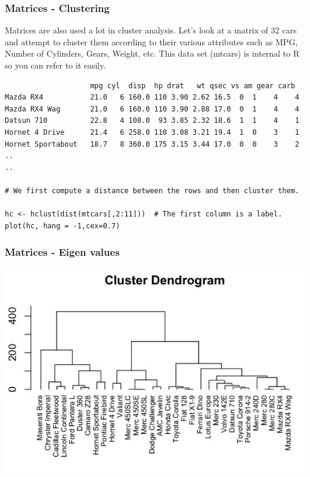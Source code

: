 \documentclass{beamer}
\begin{document}
%

\begin{frame}[fragile]
\frametitle{Matrices - Clustering}
Matrices are also used a lot in cluster analysis. Let's look at a matrix of 32 cars and attempt to cluster them according to their various attributes such as MPG, Number of Cylinders, Gears, Weight, etc. This data set (mtcars) is internal to R so you can refer to it easily.
\newline
\scriptsize
\begin{verbatim}
                    mpg cyl  disp  hp drat   wt qsec vs am gear carb
Mazda RX4           21.0   6 160.0 110 3.90 2.62 16.5  0  1    4    4
Mazda RX4 Wag       21.0   6 160.0 110 3.90 2.88 17.0  0  1    4    4
Datsun 710          22.8   4 108.0  93 3.85 2.32 18.6  1  1    4    1
Hornet 4 Drive      21.4   6 258.0 110 3.08 3.21 19.4  1  0    3    1
Hornet Sportabout   18.7   8 360.0 175 3.15 3.44 17.0  0  0    3    2
..
..

# We first compute a distance between the rows and then cluster them.

hc <- hclust(dist(mtcars[,2:11]))  # The first column is a label. 
plot(hc, hang = -1,cex=0.7)

\end{verbatim}
\end{frame}

%

\begin{frame}[fragile]
\frametitle{Matrices - Eigen values}
\begin{center}
\includegraphics{../IMG/dendro.png}
\end{center}
\end{frame}
\end{document}
